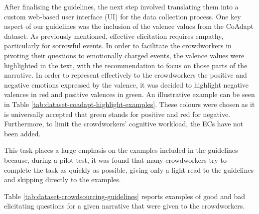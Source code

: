
After finalising the guidelines, the next step involved translating them into a custom web-based user interface (UI) for the data collection process. One key aspect of our guidelines was the inclusion of the valence values from the CoAdapt dataset. 
As previously mentioned, effective elicitation requires empathy, particularly for sorrowful events. In order to facilitate the crowdworkers in pivoting their questions to emotionally charged events, the valence values were highlighted in the text, with the recommendation to focus on those parts of the narrative. In order to represent effectively to the crowdworkers the positive and negative emotions expressed by the valence, it was decided to highlight negative valences in red and positive valences in green. An illustrative example can be seen in Table \ref{tab:dataset-coadapt-highlight-examples}. These colours were chosen as it is universally accepted that green stands for positive and red for negative. Furthermore, to limit the crowdworkers' cognitive workload, the ECs have not been added.

This task places a large emphasis on the examples included in the guidelines because, during a pilot test, it was found that many crowdworkers try to complete the task as quickly as possible, giving only a light read to the guidelines and skipping directly to the examples. 

Table \ref{tab:dataset-crowdsourcing-guidelines} reports examples of good and bad elicitating questions for a given narrative that were given to the crowdworkers. 

